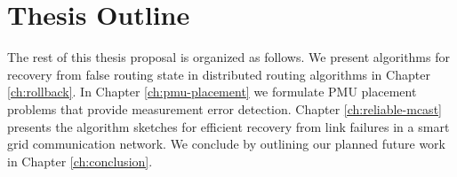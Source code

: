 \section{Thesis Outline}


The rest of this thesis proposal is organized as follows.  We present algorithms for recovery from false routing state in distributed routing algorithms in Chapter \ref{ch:rollback}.  In Chapter \ref{ch:pmu-placement} we formulate
PMU placement problems that provide measurement error detection.  Chapter \ref{ch:reliable-mcast} presents the algorithm sketches for efficient recovery from link failures in a smart grid communication network.  We conclude
by outlining our planned future work in Chapter \ref{ch:conclusion}.

